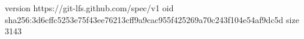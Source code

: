 version https://git-lfs.github.com/spec/v1
oid sha256:3d6cffc5253e75f43ee76213cff9a9cac955f425269a70c243f104e54af9dc5d
size 3143
